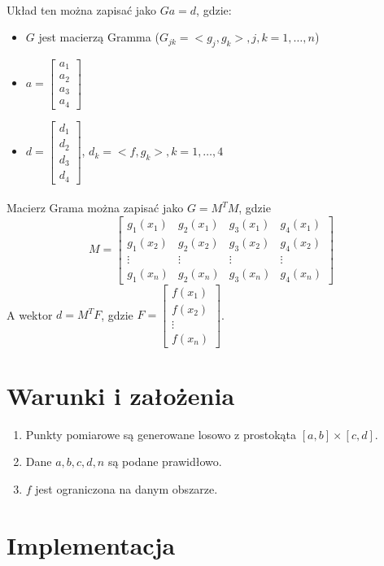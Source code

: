 \documentclass{article}
\begin{document}
\paragraph{}
Układ ten można zapisać jako $Ga=d$, gdzie:
\begin{itemize}
\item $G$ jest macierzą Gramma ($G_{jk}=<g_j,g_k>,j,k=1,\dots,n$)
\item $a=\begin{bmatrix} a_1\\a_2\\a_3\\a_4\end{bmatrix}$
\item $d=\begin{bmatrix} d_1\\d_2\\d_3\\d_4\end{bmatrix}$, $d_k=<f,g_k>,k=1,\dots,4$
\end{itemize}
\paragraph{}
Macierz Grama można zapisać jako $G=M^TM$, gdzie
$$M = \begin{bmatrix}
g_1(x_1) & g_2(x_1) & g_3(x_1) & g_4(x_1)\\
g_1(x_2) & g_2(x_2) & g_3(x_2) & g_4(x_2)\\
\vdots & \vdots & \vdots & \vdots\\
g_1(x_n) & g_2(x_n) & g_3(x_n) & g_4(x_n)
\end{bmatrix}$$
A wektor $d=M^TF$, gdzie $F=\begin{bmatrix}f(x_1)\\f(x_2)\\\vdots\\f(x_n)\end{bmatrix}$.
\section{Warunki i założenia}
\begin{enumerate}
\item Punkty pomiarowe są generowane losowo z prostokąta $[a,b]\times[c,d]$.
\item Dane $a,b,c,d,n$ są podane prawidłowo.
\item $f$ jest ograniczona na danym obszarze.
\end{enumerate}
\section{Implementacja}
\end{document}

